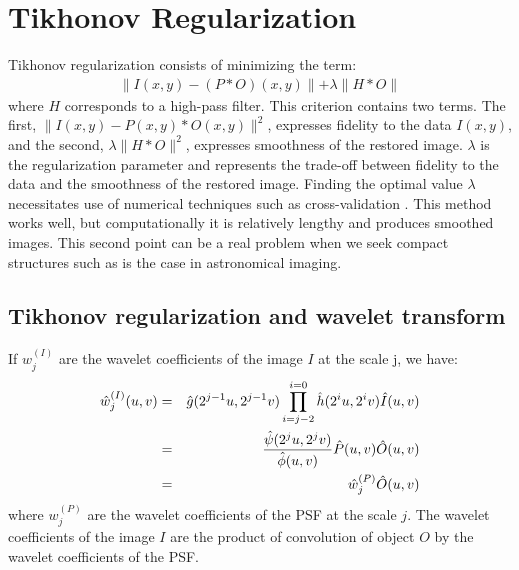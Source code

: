 \section{Tikhonov Regularization}
Tikhonov regularization \cite{rest:tikhonov77} consists of minimizing the term:
\begin{eqnarray}
 \parallel I(x,y) - (P * O)(x,y) \parallel + \lambda \parallel H * O\parallel
\end{eqnarray}
 where $H$ corresponds to a high-pass filter. 
This criterion contains two terms. 
The first, $\parallel I(x,y) - P(x,y)* O(x,y) \parallel^2$, expresses
 fidelity to the data $I(x,y)$, and the second, 
$\lambda \parallel H * O\parallel^2$,  expresses 
smoothness of the restored image. 
$\lambda$ is the
regularization parameter and represents the trade-off between
fidelity to the data and the smoothness of the restored image. Finding
the optimal value $\lambda$ necessitates use of numerical techniques such as
cross-validation \cite{rest:golub79,rest:galatsanos92}. 
This method works well, but computationally it is relatively lengthy
and produces smoothed images. This second point can be a real problem
when we seek compact structures such as is the case in astronomical imaging.

\subsection*{Tikhonov regularization and wavelet transform}
\label{direct_dec}
If $w_j^{(I)}$ are the wavelet coefficients of 
the image $I$ at the scale j, we have:
\begin{eqnarray}
 \hat{w}_j^{(I)}(u,v) & = & \hat{g}(2^{j-1}u, 2^{j-1}v) \prod_{i=j-2}^{i=0}\hat{h}(2^{i}u, 2^{i}v) \hat{I}(u,v) \nonumber \\
      & = &    {\hat{\psi}(2^{j}u, 2^{j}v) \over \hat{\phi}(u,v)} \hat{P}(u,v) \hat{O}(u,v) \\
      & = &   \hat{w}_j^{(P)} \hat{O}(u,v) \nonumber
\label{eq_cpphi}
\end{eqnarray}
where $w_{j}^{(P)}$ are the wavelet coefficients of the PSF at the scale $j$.
The wavelet coefficients of the image $I$ are the product of convolution
of object $O$ by the  wavelet coefficients of the PSF.

